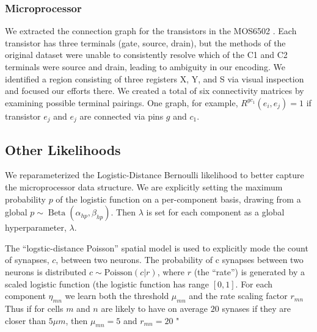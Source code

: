 \documentclass{article}
\begin{document}
\subsubsection*{Microprocessor}
We extracted the connection graph for the transistors in the MOS6502
\autocite{visual6502source}. Each transistor has three terminals (gate,
source, drain), but the methods of the original dataset were unable to
consistently resolve which of the C1 and C2 terminals were source and
drain, leading to ambiguity in our encoding. We identified a region
consisting of three registers X, Y, and S via visual
inspection and focused our efforts there. We created a total of six
connectivity matrices by examining possible terminal pairings. One
graph, for example, $R^{gc_1}(e_i, e_j)=1$ if transistor $e_j$ and
$e_j$ are connected via pins $g$ and $c_1$. 



\subsection*{Other Likelihoods}
\label{supp:otherlikelihoods}

We reparameterized the Logistic-Distance Bernoulli likelihood to
better capture the microprocessor data structure. We are explicitly
setting the maximum probability $p$ of the logistic function on a
per-component basis, drawing from a global $p \sim \operatorname{Beta}(\alpha_{hp},
\beta_{hp})$. Then $\lambda$ is set for each component as a global
hyperparameter, $\lambda$.

The ``logstic-distance Poisson'' spatial model is used to explicitly
mode the count of synapses, $c$, between two neurons. The probability
of c synapses between two neurons is distributed $c \sim
\textrm{Poisson}(c | r)$, where $r$ (the ``rate'') is generated by a
scaled logistic function (the logistic function has range $[0,
1]$. For each component $\eta_{mn}$ we learn both the threshold
$\mu_{mn}$ and the rate scaling factor $r_{mn}$ Thus if for cells $m$
and $n$ are likely to have on average $20$ synases if they are closer
than $5 \mu m$, then $\mu_{mn} = 5$ and $r_{mn} = 20$ "
\end{document}
